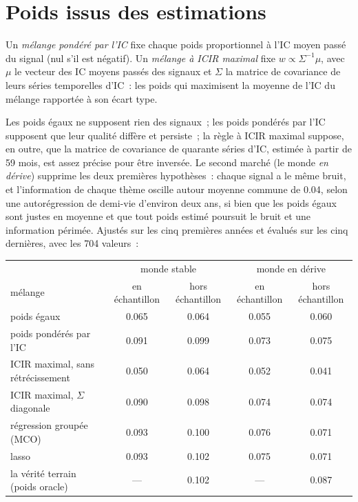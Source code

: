 \section{Poids issus des estimations}

\begin{definition}\label{def:rs:signal-combination:weights}
Un \emph{mélange pondéré par l'IC} fixe chaque poids proportionnel à l'IC moyen passé du signal (nul s'il est négatif). Un
\emph{mélange à ICIR maximal} fixe $w \propto \Sigma^{-1}\mu$, avec $\mu$ le vecteur des IC moyens passés des signaux et
$\Sigma$ la matrice de covariance de leurs séries temporelles d'IC~: les poids qui maximisent la moyenne de l'IC du mélange rapportée à son écart type.
\end{definition}

Les poids égaux ne supposent rien des signaux~; les poids pondérés par l'IC supposent que leur qualité diffère et persiste~; la règle à ICIR maximal suppose, en
outre, que la matrice de covariance de quarante séries d'IC, estimée à partir de 59 mois, est assez précise pour être inversée. Le second marché (le
monde \emph{en dérive}) supprime les deux premières hypothèses~: chaque signal a le même bruit, et l'information de chaque thème oscille autour
moyenne commune de 0.04, selon une autorégression de demi-vie d'environ deux ans, si bien que les poids égaux sont justes en moyenne et que tout poids estimé
poursuit le bruit et une information périmée. Ajustés sur les cinq premières années et évalués sur les cinq dernières, avec les 704 valeurs~:

\begin{center}
\small
\setlength{\tabcolsep}{4pt}%
\begin{tabular}{@{}lcccc@{}}
\toprule
 & \multicolumn{2}{c}{monde stable} & \multicolumn{2}{c}{monde en dérive}\\
mélange & en échantillon & hors échantillon & en échantillon & hors échantillon\\
\midrule
poids égaux & 0.065 & 0.064 & 0.055 & 0.060\\
poids pondérés par l'IC & 0.091 & 0.099 & 0.073 & 0.075\\
ICIR maximal, sans rétrécissement & 0.050 & 0.064 & 0.052 & 0.041\\
ICIR maximal, $\Sigma$ diagonale & 0.090 & 0.098 & 0.074 & 0.074\\
régression groupée (MCO) & 0.093 & 0.100 & 0.076 & 0.071\\
lasso & 0.093 & 0.102 & 0.075 & 0.071\\
la vérité terrain (poids oracle) & --- & 0.102 & --- & 0.087\\
\bottomrule
\end{tabular}
\end{center}


